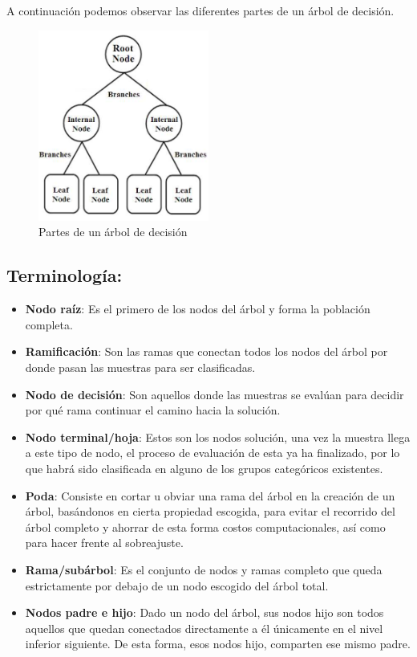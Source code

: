 A continuación podemos observar las diferentes partes de un árbol de decisión.
 
  \begin{figure}[H]
 	\centering
 	\includegraphics[width=0.5\textwidth]{imagenes/ejemploArbol} 
 	\caption{Partes de un árbol de decisión \cite{ref5}}
 \end{figure}

\subsection{Terminología:}
\begin{itemize}
	\item \textbf{Nodo raíz}: Es el primero de los nodos del árbol y forma la población completa.
	\item \textbf{Ramificación}: Son las ramas que conectan todos los nodos del árbol por donde pasan las muestras para ser clasificadas.
	\item \textbf{Nodo de decisión}: Son aquellos donde las muestras se evalúan para decidir por qué rama continuar el camino hacia la solución.
	\item \textbf{Nodo terminal/hoja}: Estos son los nodos solución, una vez la muestra llega a este tipo de nodo, el proceso de evaluación de esta ya ha finalizado, por lo que habrá sido clasificada en alguno de los grupos categóricos existentes.
	\item \textbf{Poda}: Consiste en cortar u obviar una rama del árbol en la creación de un árbol, basándonos en cierta propiedad escogida, para evitar el recorrido del árbol completo y ahorrar de esta forma costos computacionales, así como para hacer frente al sobreajuste.
	\item \textbf{Rama/subárbol}: Es el conjunto de nodos y ramas completo que queda estrictamente por debajo de un nodo escogido del árbol total.
	\item \textbf{Nodos padre e hijo}: Dado un nodo del árbol, sus nodos hijo son todos aquellos que quedan conectados directamente a él únicamente en el nivel inferior siguiente. De esta forma, esos nodos hijo, comparten ese mismo padre.
\end{itemize}


